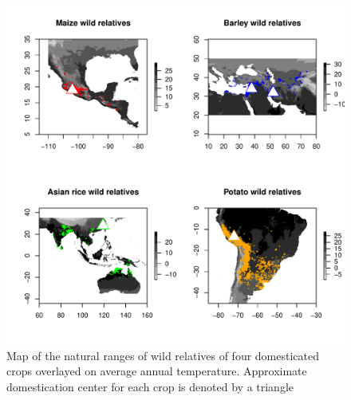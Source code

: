 \documentclass[11pt]{article}
\begin{document}
\begin{figure}[h]
	\centering
	\includegraphics[width=15cm]{temperature_plot_degC.pdf}
	\caption{Map of the natural ranges of wild relatives of four domesticated crops overlayed on average annual temperature. Approximate domestication center for each crop is denoted by a triangle}
	\label{fig:map}
\end{figure}
\end{document}
